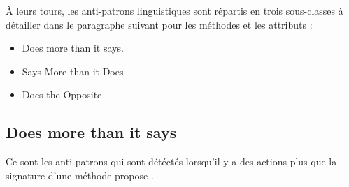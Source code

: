 À leurs tours, les anti-patrons linguistiques sont répartis en trois sous-classes à détailler dans le paragraphe suivant pour les méthodes et les attributs \cite{palomba2015anti}:
\begin{itemize}
\item Does more than it says.
\item Says More than it Does
\item Does the Opposite
\end{itemize}
\renewcommand{\thesubsection}{\thesection.\alph{subsection}}
\subsection{Does more than it says}
Ce sont les anti-patrons qui sont détéctés lorsqu’il y a des actions plus que la signature d’une méthode propose \cite{arnaoudova2013new}.

